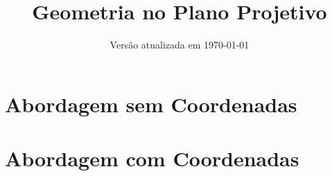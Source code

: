 \documentclass{scrbook}
\title{Geometria no Plano Projetivo}
\author{}
\date{Versão atualizada em \today}
\theoremstyle{definition}
\theoremstyle{remark}
\begin{document}
	\maketitle

	\tableofcontents

	

	\part{Abordagem sem Coordenadas}


	\part{Abordagem com Coordenadas}

	
	
	
	
    
	\printbibliography
\end{document}
